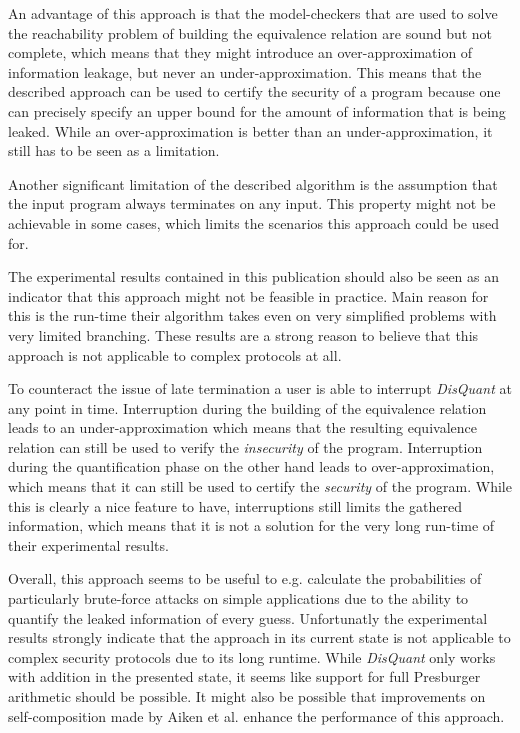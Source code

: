 \documentclass[a4paper,UKenglish]{lipics-v2018}
\begin{document}
An advantage of this approach is that the model-checkers that are used to solve the reachability problem of building the equivalence relation are sound but not complete, which means that they might introduce an over-approximation of information leakage, but never an under-approximation. This means that the described approach can be used to certify the security of a program because one can precisely specify an upper bound for the amount of information that is being leaked.\cite{automatic_discovery_and_quantification} While an over-approximation is better than an under-approximation, it still has to be seen as a limitation.

Another significant limitation of the described algorithm is the assumption that the input program always terminates on any input. This property might not be achievable in some cases, which limits the scenarios this approach could be used for.

The experimental results contained in this publication should also be seen as an indicator that this approach might not be feasible in practice. Main reason for this is the run-time their algorithm takes even on very simplified problems with very limited branching. These results are a strong reason to believe that this approach is not applicable to complex protocols at all.
\cite{automatic_discovery_and_quantification}

To counteract the issue of late termination a user is able to interrupt \textit{DisQuant} at any point in time. Interruption during the building of the equivalence relation leads to an under-approximation which means that the resulting equivalence relation can still be used to verify the \textit{insecurity} of the program. Interruption during the quantification phase on the other hand leads to over-approximation, which means that it can still be used to certify the \textit{security} of the program. While this is clearly a nice feature to have, interruptions still limits the gathered information, which means that it is not a solution for the very long run-time of their experimental results.
\cite{automatic_discovery_and_quantification}

Overall, this approach seems to be useful to e.g. calculate the probabilities of particularly brute-force attacks on simple applications due to the ability to quantify the leaked information of every guess. Unfortunatly the experimental results strongly indicate that the approach in its current state is not applicable to complex security protocols due to its long runtime. While \textit{DisQuant} only works with addition in the presented state, it seems like support for full Presburger  arithmetic should be possible. It might also be possible that improvements on self-composition made by Aiken et al. enhance the performance of this approach.\cite{secure_information_flow_safety}
\end{document}

